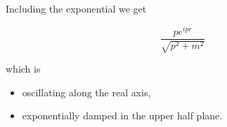 \documentclass{beamer}
\newcommand{\integrand}{\frac{p e^{ipr}}{\sqrt{p^2 + m^2}}}
\begin{document}



\begin{frame}
Including the exponential we get

$$\integrand$$

which is

\begin{itemize}
\pause
\item \alert{oscillating} along the real axis,

\pause
\item \alert{exponentially damped} in the upper half plane.
\end{itemize}
\end{frame}




\end{document}

